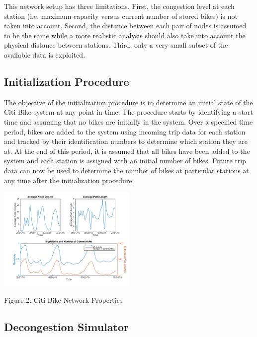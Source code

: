 \documentclass[times, 10pt,twocolumn]{article}
\begin{document}
This network setup has three limitations. First, the congestion level at each station (i.e. maximum capacity versus current number of stored bikes) is not taken into account. Second, the distance between each pair of nodes is assumed to be the same while a more realistic analysis should also take into account the physical distance between stations. Third, only a very small subset of the available data is exploited.

\subsection{Initialization Procedure}
The objective of the initialization procedure is to determine an initial state of the Citi Bike system at any point in time. The procedure starts by identifying a start time and assuming that no bikes are initially in the system. Over a specified time period, bikes are added to the system using incoming trip data for each station and tracked by their identification numbers to determine which station they are at. At the end of this period, it is assumed that all bikes have been added to the system and each station is assigned with an initial number of bikes. Future trip data can now be used to determine the number of bikes at particular stations at any time after the initialization procedure.

\centerline{\includegraphics[width=0.5\textwidth]{m2/plotterfigure.png}}
\centerline{Figure 2: Citi Bike Network Properties}

\subsection{Decongestion Simulator}
\end{document}
